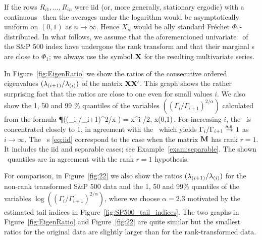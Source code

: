 If the rows $R_{i1}, \ldots, R_{in}$ were iid (or, more generally, stationary ergodic)
with a continuous \ds\  then
the averages under the logarithm would be  asymptotically uniform
on $(0,1)$ as $n \to \infty$. Hence $X_{it}$ would  be \asy ally standard
Fr\'echet $\Phi_1$-distributed.
In what follows, we assume that the aforementioned univariate \ts\ of the S\&P 500 index have undergone the rank transform and that
their marginal \ds s are close to $\Phi_1$; we
always use the symbol ${\mathbf X}$ for the resulting multivariate series.
\par
In Figure~\ref{fig:EigenRatio} we show the ratios of the consecutive ordered eigenvalues $(\lambda_{(i+1)}/\lambda_{(i)})$
of the matrix ${\mathbf X}{\mathbf X}'$. This graph shows the rather surprising fact that the ratios are close to one even for small values $i$.
We also show the 1, 50 and 99 \% quantiles of the variables $((\Gamma_{i}/\Gamma_{i+1})^{2/\alpha})$ calculated from the formula
\beam\label{eq:iid}
\P\big((\Gamma_{i} /\Gamma_{i+1})^{2/\alpha}\le x \big) = x^{i \cdot \alpha/2}, \quad x\in (0,1)\,.
\eeam
For increasing $i$, the \ds\ is concentrated closely to 1, in agreement with the \slln\ which yields
$\Gamma_{i} /\Gamma_{i+1}\stackrel{\rm a.s.}{\rightarrow} 1$ as $i\to\infty$.
The \asy\ \ds s \eqref{eq:iid} correspond to the case when the matrix
${\mathbf M}$ has rank $r=1$. It includes the iid and separable cases;
see Example~\ref{exam:separable}. The shown \asy\ quantiles are in agreement with the rank $r=1$ hypothesis.
\par
For comparison, in Figure~\ref{fig:22} we also show the ratios  $(\lambda_{(i+1)}/\lambda_{(i)})$ for the 
non-rank transformed S\&P 500 data and the 1, 50 and 99\% quantiles of the variables
$\log((\Gamma_i/ \Gamma_{i+1})^{2/\alpha})$, where we choose $\alpha=2.3$ motivated by the estimated tail indices in 
Figure~\ref{fig:SP500_tail_indices}.
The two graphs in Figure~\ref{fig:EigenRatio} and Figure~\ref{fig:22} are quite similar but the smallest ratios for the original data are slightly larger than
for the rank-transformed data.




